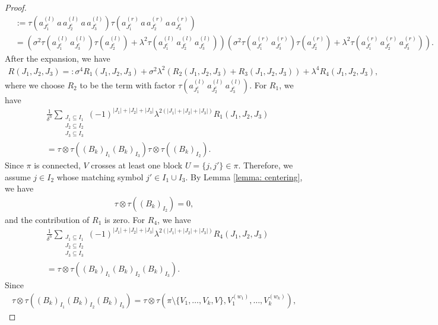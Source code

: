 \documentclass[12pt,reqno]{amsart}
\theoremstyle{plain}
\newcommand{\1}{\mathbf{1}}
\begin{document}
\begin{proof}
\begin{align*}
        &:=\tau\left(a_{J_1^c}^{(l)}\, a \, a_{J_2^c}^{(l)}\, a \, a_{J_3^c}^{(l)}\right)\tau\left(a_{J_1^c}^{(r)}\, a \, a_{J_2^c}^{(r)}\, a\, a_{J_3^c}^{(r)}\right)\\
        &=\left(\sigma^2\tau(a_{J_1^c}^{(l)}\, a_{J_3^c}^{(l)})\tau(a_{J_2^c}^{(l)})+\lambda^2\tau(a_{J_1^c}^{(l)}\, a_{J_2^c}^{(l)}\, a_{J_3^c}^{(l)})\right)
        \left(\sigma^2\tau(a_{J_1^c}^{(r)}\, a_{J_3^c}^{(r)})\tau(a_{J_2^c}^{(r)})+\lambda^2\tau(a_{J_1^c}^{(r)}\, a_{J_2^c}^{(r)}\, a_{J_3^c}^{(r)})\right).
    \end{align*}
    After the expansion, we have
    \begin{align*}
        R(J_1,J_2,J_3)=:\sigma^4R_1(J_1,J_2,J_3)+\sigma^2\lambda^2 \left(R_2(J_1,J_2,J_3)+R_3(J_1,J_2,J_3)\right)+\lambda^4R_4(J_1,J_2,J_3),
    \end{align*}
    where we choose $R_2$ to be the term with factor $\tau(a_{J_1^c}^{(l)}\, a_{J_2^c}^{(l)}\, a_{J_3^c}^{(l)})$. For $R_1$, we have
    \begin{align*}
        &\frac{1}{\delta^h}\sum_{\substack{J_1 \subseteq I_1\\ J_2 \subseteq I_2\\ J_3 \subseteq I_3}}(-1)^{|J_1|+|J_2|+|J_3|}\lambda^{2(|J_1|+|J_2|+|J_3|)}R_1(J_1,J_2,J_3)\\
        &=\tau\otimes \tau \left(\left(B_k\right)_{I_1}\left(B_k\right)_{I_3}\right)\tau\otimes \tau\left(\left(B_k\right)_{I_2}\right).
    \end{align*}
    Since $\pi$ is connected, $V$ crosses at least one block $U=\{j,j'\} \in \pi$. Therefore, we assume $j \in I_2$ whose matching symbol $j' \in I_1\cup I_3$. By Lemma \ref{lemma: centering}, we have
    \begin{align*}
        \tau\otimes \tau\left(\left(B_k\right)_{I_2}\right)=0,
    \end{align*}
    and the contribution of $R_1$ is zero. For $R_4$, we have
    \begin{align*}
        &\frac{1}{\delta^h}\sum_{\substack{J_1 \subseteq I_1\\ J_2 \subseteq I_2\\ J_3 \subseteq I_3}}(-1)^{|J_1|+|J_2|+|J_3|}\lambda^{2(|J_1|+|J_2|+|J_3|)}R_4(J_1,J_2,J_3)\\
        &=\tau\otimes \tau \left(\left(B_k\right)_{I_1}\left(B_k\right)_{I_2}\left(B_k\right)_{I_3}\right).
    \end{align*}
    Since
    \begin{align*}
        \tau\otimes \tau \left(\left(B_k\right)_{I_1}\left(B_k\right)_{I_2}\left(B_k\right)_{I_3}\right)=\tau\otimes\tau\left(\pi\setminus\{V_1,\ldots,V_k,V\},V_1^{(w_1)},\ldots,V_k^{(w_k)}\right),

\end{align*}
\end{proof}
\end{document}
